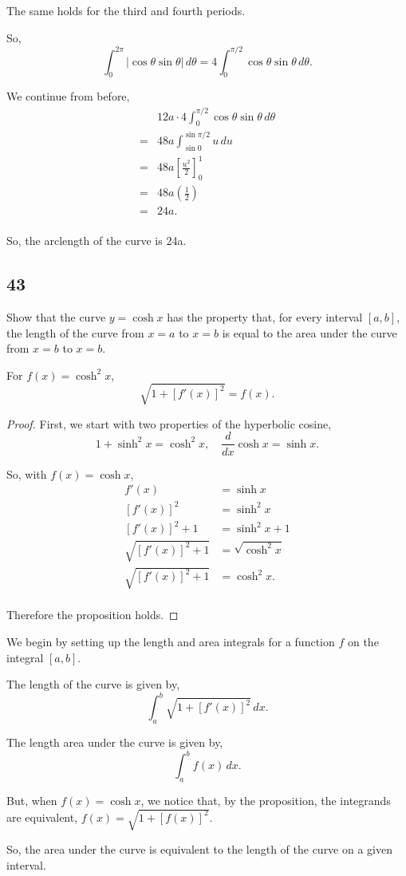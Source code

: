 \documentclass[../hw10]{subfiles}
\begin{document}
The same holds for the third and fourth periods.

So, \[\int_{0}^{2\pi} |\cos{\theta}\sin{\theta}| \, d\theta = 4\int_{0}^{\pi/2} \cos{\theta}\sin{\theta} \, d\theta.\]

We continue from before,
\begin{align*}
    &12a\cdot4\int_{0}^{\pi/2} \cos{\theta}\sin{\theta}\, d\theta \\
    =& 48a\int_{\sin{0}}^{\sin{\pi/2}} u\,du \\
    =& 48a {\left[ \frac{u^2}{2} \right]}_{0}^{1} \\
    =& 48a\left( \frac{1}{2} \right) \\
    =& 24a. \\
\end{align*}

So, the arclength of the curve is 24a.


\subsection*{43}
Show that the curve $y=\cosh{x}$ has the property that, for every interval $[a,b]$, the length of the curve from $x=a$ to $x=b$ is equal to the area under the curve from $x=b$ to $x=b$.

\begin{proposition}
    For $f(x)=\cosh^2{x}$,
    \[\sqrt{1+{[f'(x)]}^2}=f(x).\]
\end{proposition}

\begin{proof}
    First, we start with two properties of the hyperbolic cosine, 
    \[1+\sinh^2{x}=\cosh^2{x}, \quad \frac{d}{dx}\cosh{x}=\sinh{x}.\]
    
    So, with $f(x)=\cosh{x}$,
    \begin{align*}
        f'(x)&=\sinh{x} \\
        {[f'(x)]}^2&=\sinh^2{x} \\
        {[f'(x)]}^2+1&=\sinh^2{x}+1\\
        \sqrt{{[f'(x)]}^2+1}&=\sqrt{\cosh^2{x}} \\
        \sqrt{{[f'(x)]}^2+1}&=\cosh^2{x}. \\
    \end{align*}

    Therefore the proposition holds.
\end{proof}

We begin by setting up the length and area integrals for a function $f$ on the integral $[a,b]$.

The length of the curve is given by, \[\int_{a}^{b}\sqrt{1+{[f'(x)]}^2}\, dx.\]

The length area under the curve is given by, \[\int_{a}^{b}f(x)\, dx.\]

But, when $f(x)=\cosh{x}$, we notice that, by the proposition, the integrands are equivalent, $f(x)=\sqrt{1+{[f(x)]}^2}$.

So, the area under the curve is equivalent to the length of the curve on a given interval.
\end{document}

